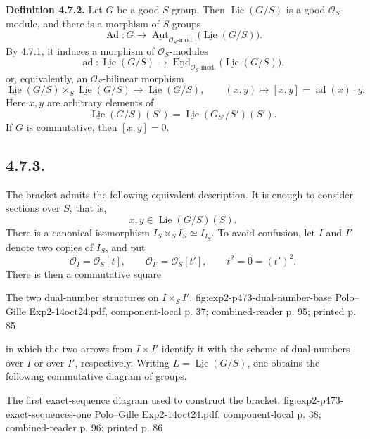 \medskip
\noindent\textbf{Definition 4.7.2.}
Let \(G\) be a good \(S\)-group. Then
\(\underline{\operatorname{Lie}}(G/S)\) is a good
\(\mathcal O_S\)-module, and there is a morphism of \(S\)-groups
\[
 \operatorname{Ad}:G\longrightarrow
 \underline{\operatorname{Aut}}_{\mathcal O_S\text{-mod.}}
   \bigl(\underline{\operatorname{Lie}}(G/S)\bigr).
\]
By 4.7.1, it induces a morphism of \(\mathcal O_S\)-modules
\[
 \operatorname{ad}:
 \underline{\operatorname{Lie}}(G/S)
 \longrightarrow
 \underline{\operatorname{End}}_{\mathcal O_S\text{-mod.}}
   \bigl(\underline{\operatorname{Lie}}(G/S)\bigr),
\]
or, equivalently, an \(\mathcal O_S\)-bilinear morphism
\[
 \underline{\operatorname{Lie}}(G/S)
 \times_S
 \underline{\operatorname{Lie}}(G/S)
 \longrightarrow
 \underline{\operatorname{Lie}}(G/S),
 \qquad
 (x,y)\longmapsto[x,y]=\operatorname{ad}(x)\cdot y.
\]
Here \(x,y\) are arbitrary elements of
\[
 \underline{\operatorname{Lie}}(G/S)(S')
 =
 \underline{\operatorname{Lie}}(G_{S'}/S')(S').
\]
If \(G\) is commutative, then \([x,y]=0\).

\subsection*{4.7.3.}
The bracket admits the following equivalent description. It is enough
to consider sections over \(S\), that is,
\[
 x,y\in\underline{\operatorname{Lie}}(G/S)(S).
\]
There is a canonical isomorphism
\(I_S\times_SI_S\simeq I_{I_S}\). To avoid confusion, let \(I\) and
\(I'\) denote two copies of \(I_S\), and put
\[
 \mathcal O_I=\mathcal O_S[t],
 \qquad
 \mathcal O_{I'}=\mathcal O_S[t'],
 \qquad
 t^2=0=(t')^2.
\]
There is then a commutative square

  {The two dual-number structures on \(I\times_S I'\).}
  {fig:exp2-p473-dual-number-base}
  {Polo--Gille Exp2-14oct24.pdf, component-local p. 37; combined-reader p. 95; printed p. 85}

in which the two arrows from \(I\times I'\) identify it with the
scheme of dual numbers over \(I\) or over \(I'\), respectively.
Writing \(L=\underline{\operatorname{Lie}}(G/S)\), one obtains the
following commutative diagram of groups.

  {The first exact-sequence diagram used to construct the bracket.}
  {fig:exp2-p473-exact-sequences-one}
  {Polo--Gille Exp2-14oct24.pdf, component-local p. 38; combined-reader p. 96; printed p. 86}

